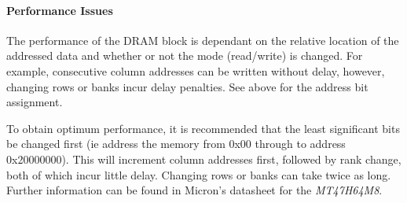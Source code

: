{\paragraph{Performance Issues}

The performance of the DRAM block is dependant on the relative location of the addressed data and whether or not the mode (read/write) is changed. For example, consecutive column addresses can be written without delay, however, changing rows or banks incur delay penalties. See above for the address bit assignment.

To obtain optimum performance, it is recommended that the least significant bits be changed first (ie address the memory from 0x00 through to address 0x20000000). This will increment column addresses first, followed by rank change, both of which incur little delay. Changing rows or banks can take twice as long. Further information can be found in Micron's datasheet for the \textit{MT47H64M8}.



}



